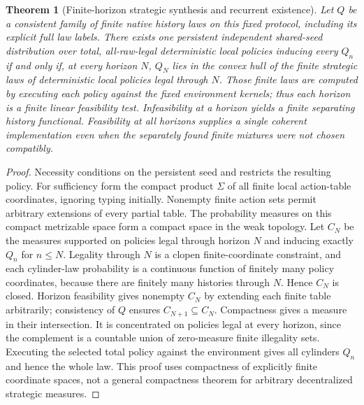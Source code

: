\documentclass[11pt]{article}
\newtheorem{theorem}{Theorem}\newtheorem{proposition}{Proposition}\newtheorem{corollary}{Corollary}
\begin{document}
\begin{theorem}[Finite-horizon strategic synthesis and recurrent existence]\label{thm:compact}
Let $Q$ be a consistent family of finite native history laws on this fixed protocol, including its explicit full law labels. There exists one persistent independent shared-seed distribution over total, all-raw-legal deterministic local policies inducing every $Q_n$ if and only if, at every horizon $N$, $Q_N$ lies in the convex hull of the finite strategic laws of deterministic local policies legal through $N$. Those finite laws are computed by executing each policy against the fixed environment kernels; thus each horizon is a finite linear feasibility test. Infeasibility at a horizon yields a finite separating history functional. Feasibility at all horizons supplies a single coherent implementation even when the separately found finite mixtures were not chosen compatibly.
\end{theorem}
\begin{proof}
Necessity conditions on the persistent seed and restricts the resulting policy. For sufficiency form the compact product $\Sigma$ of all finite local action-table coordinates, ignoring typing initially. Nonempty finite action sets permit arbitrary extensions of every partial table. The probability measures on this compact metrizable space form a compact space in the weak topology. Let $C_N$ be the measures supported on policies legal through horizon $N$ and inducing exactly $Q_n$ for $n\leq N$. Legality through $N$ is a clopen finite-coordinate constraint, and each cylinder-law probability is a continuous function of finitely many policy coordinates, because there are finitely many histories through $N$. Hence $C_N$ is closed. Horizon feasibility gives nonempty $C_N$ by extending each finite table arbitrarily; consistency of $Q$ ensures $C_{N+1}\subseteq C_N$. Compactness gives a measure in their intersection. It is concentrated on policies legal at every horizon, since the complement is a countable union of zero-measure finite illegality sets. Executing the selected total policy against the environment gives all cylinders $Q_n$ and hence the whole law. This proof uses compactness of explicitly finite coordinate spaces, not a general compactness theorem for arbitrary decentralized strategic measures.
\end{proof}
\end{document}
